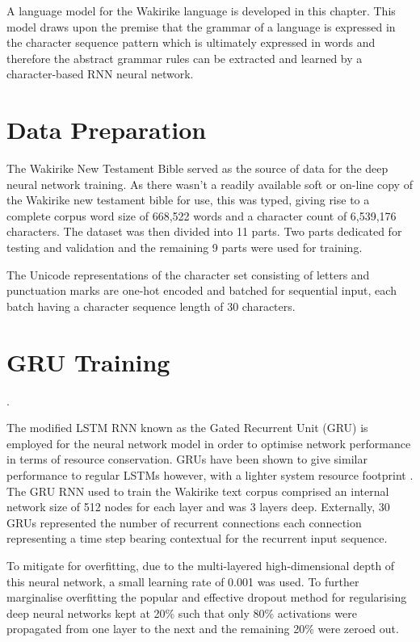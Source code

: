 A language model for the Wakirike language is developed in this chapter.  This model draws upon the premise that the grammar of a language is expressed in the character sequence pattern which is ultimately expressed in words and therefore the abstract grammar rules can be extracted and learned by a character-based RNN neural network.

\section{Data Preparation}
The Wakirike New Testament Bible served as the source of data for the deep neural network training.  As there wasn't a readily available soft or on-line copy of the Wakirike new testament bible for use, this was typed, giving rise to a complete corpus word size of 668,522 words and a character count of 6,539,176 characters. The dataset was then divided into 11 parts. Two parts dedicated for testing and validation and the remaining 9 parts were used for training.

The Unicode representations of the character set consisting of letters and punctuation marks are one-hot encoded and batched for sequential input, each batch having a character sequence length of 30 characters.


\section{GRU Training}.

The modified LSTM RNN known as the Gated Recurrent Unit (GRU) is employed for the neural network model in order to optimise network performance in terms of resource conservation.  GRUs have been shown to give similar performance to regular LSTMs however, with a lighter system resource footprint \citep{cho2014learning}. The GRU RNN used to train the Wakirike text corpus comprised an internal network size of 512 nodes for each layer and was 3 layers deep. Externally, 30 GRUs represented  the number of recurrent connections each connection representing a time step bearing contextual for the recurrent input sequence. 

To mitigate for overfitting, due to the multi-layered high-dimensional depth of this neural network, a small learning rate of 0.001 was used. To further marginalise overfitting the popular and effective dropout \citep{srivastava2014dropout} method for regularising deep neural networks kept at 20\% such that only 80\% activations were propagated from one layer to the next and the remaining 20\% were zeroed out.

